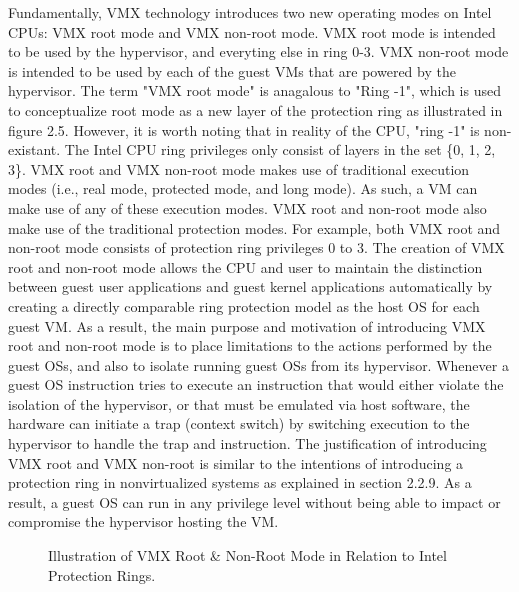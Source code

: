 \documentclass{report}
\begin{document}
\begin{spacing}{1.5}
{\large
\noindent Fundamentally, VMX technology introduces two new operating modes on Intel CPUs: VMX root mode and VMX non-root mode. VMX root mode is intended to be used by the hypervisor, and everyting else in ring 0-3. VMX non-root mode is intended to be used by each of the guest VMs that are powered by the hypervisor. The term "VMX root mode" is anagalous to "Ring -1", which is used to conceptualize root mode as a new layer of the protection ring as illustrated in figure 2.5. However, it is worth noting that in reality of the CPU, "ring -1" is non-existant. The Intel CPU ring privileges only consist of layers in the set \{0, 1, 2, 3\}. VMX root and VMX non-root mode makes use of traditional execution modes (i.e., real mode, protected mode, and long mode). As such, a VM can make use of any of these execution modes. VMX root and non-root mode also make use of the traditional protection modes. For example, both VMX root and non-root mode consists of protection ring privileges 0 to 3. The creation of VMX root and non-root mode allows the CPU and user to maintain the distinction between guest user applications and guest kernel applications automatically by creating a directly comparable ring protection model as the host OS for each guest VM. As a result, the main purpose and motivation of introducing VMX root and non-root mode is to place limitations to the actions performed by the guest OSs, and also to isolate running guest OSs from its hypervisor. Whenever a guest OS instruction tries to execute an instruction that would either violate the isolation of the hypervisor, or that must be emulated via host software, the hardware can initiate a trap (context switch) by switching execution to the hypervisor to handle the trap and instruction. The justification of introducing VMX root and VMX non-root is similar to the intentions of introducing a protection ring in nonvirtualized systems as explained in section 2.2.9. As a result, a guest OS can run in any privilege level without being able to impact or compromise the hypervisor hosting the VM.
\newline
}



\newpage
\vfill
\begin{figure}[ht]
\hspace*{-3cm}  
    \caption{Illustration of VMX Root \& Non-Root Mode in Relation to Intel Protection Rings.}
\end{figure}



\end{spacing}
\end{document}

